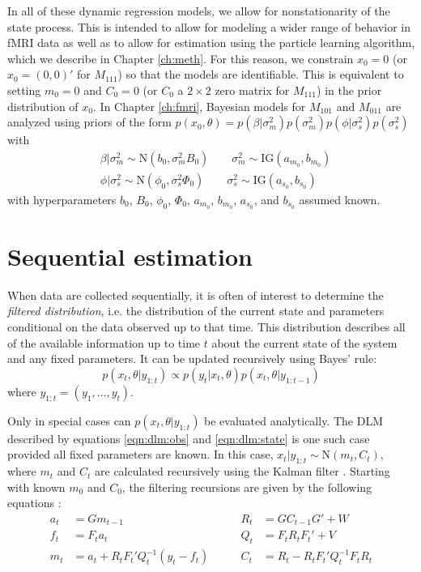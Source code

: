 In all of these dynamic regression models, we allow for nonstationarity of the state process. This is intended to allow for modeling a wider range of behavior in fMRI data as well as to allow for estimation using the particle learning algorithm, which we describe in Chapter \ref{ch:meth}. For this reason, we constrain $x_0 = 0$ (or $x_0 = (0,0)'$ for $M_{111}$) so that the models are identifiable. This is equivalent to setting $m_0 = 0$ and $C_0 = 0$ (or $C_0$ a $2 \times 2$ zero matrix for $M_{111}$) in the prior distribution of $x_0$. In Chapter \ref{ch:fmri}, Bayesian models for $M_{101}$ and $M_{011}$ are analyzed using priors of the form $p(x_0, \theta) = p(\beta|\sigma^2_m)p(\sigma^2_m)p(\phi|\sigma^2_s)p(\sigma^2_s)$ with
\begin{align}
&\beta|\sigma^2_m \sim \mbox{N}(b_0, \sigma^2_mB_0) \qquad \sigma^2_m \sim \mbox{IG}(a_{m_0}, b_{m_0}) \label{eqn:dynreg:prior1} \\
&\phi|\sigma^2_s \sim \mbox{N}(\phi_0, \sigma^2_s\Phi_0) \qquad \sigma^2_s \sim \mbox{IG}(a_{s_0}, b_{s_0}) \label{eqn:dynreg:prior2}
\end{align}
with hyperparameters $b_0$, $B_0$, $\phi_0$, $\Phi_0$, $a_{m_0}$, $b_{m_0}$, $a_{s_0}$, and $b_{s_0}$ assumed known.

\section{Sequential estimation \label{sec:sequential}}

When data are collected sequentially, it is often of interest to determine the \emph{filtered distribution}, i.e. the distribution of the current state and parameters conditional on the data observed up to that time. This distribution describes all of the available information up to time $t$ about the current state of the system and any fixed parameters. It can be updated recursively using Bayes' rule:
\begin{equation}
p(x_t,\theta| y_{1:t}) \propto p(y_t|x_t,\theta)p(x_t,\theta|y_{1:t-1}) \label{eqn:filtered}
\end{equation}
where $y_{1:t} = (y_1,\ldots,y_t)$.

Only in special cases can $p(x_t,\theta| y_{1:t})$ be evaluated analytically. The DLM described by equations \eqref{eqn:dlm:obs} and \eqref{eqn:dlm:state} is one such case provided all fixed parameters are known. In this case, $x_t|y_{1:t} \sim \mbox{N}(m_t,C_t)$, where $m_t$ and $C_t$ are calculated recursively using the Kalman filter \citep{kal:1960:ekf}. Starting with known $m_0$ and $C_0$, the filtering recursions are given by the following equations \cite[Sec 2.7.2][]{petris:camp:2009:dynamic}:
\begin{align}
a_t &= Gm_{t-1} &\qquad R_t &= GC_{t-1}G' + W \label{eqn:dlm:kal} \\
f_t &= F_ta_t &\qquad Q_t &= F_tR_tF_t' + V \nonumber \\
m_t &= a_t + R_tF_t'Q_t^{-1}(y_t-f_t) &\qquad C_t &= R_t - R_tF_t'Q_t^{-1}F_tR_t \nonumber
\end{align}

